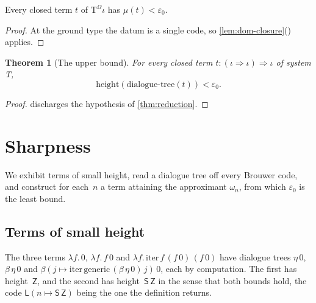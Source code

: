 \documentclass[11pt]{amsart}
\makeatletter
\newcommand{\TmO}{\mathrm{T}^{\Omega}}
\newcommand{\gr}{\iota}                      %
\newcommand{\arr}{\Rightarrow}
\newcommand{\dtree}{\mathrm{dialogue\text{-}tree}}
\newcommand{\height}{\mathrm{height}}
\newcommand{\iterop}{\mathrm{iter}}
\newcommand{\bZ}{\mathsf{Z}}
\newcommand{\bS}{\mathsf{S}}
\newcommand{\bL}{\mathsf{L}}
\newcommand{\eps}{\varepsilon_{0}}
\newcommand{\tower}[1]{\omega_{#1}}           %
\newcommand{\Mj}{\mu}                         %
\newif\ifagdarefs
\newcommand{\AgdaRefs}[1]{\ifagdarefs{\footnotesize\color{agdablue}(#1)}\else\unskip\fi}
\newcommand{\Agda}[2]{{\footnotesize\color{agdablue}\textsf{#1}%
  \ifblank{#2}{}{\texttt{.}\allowbreak\texttt{#2}}}}
\let\ttt@plain\texttt
\renewcommand{\texttt}[1]{{\footnotesize\color{agdablue}\ttt@plain{#1}}}
\theoremstyle{plain}
\newtheorem{theorem}{Theorem}[section]
\theoremstyle{definition}
\makeatother
\begin{document}
\begin{corollary}
\label{cor:mu-below}
Every closed term $t$ of $\TmO\gr$ has $\Mj(t) < \eps$.
\AgdaRefs{\Agda{DialogueTrees.Fundamental}{μᵀ-<-ε₀}.}
\end{corollary}

\begin{proof}
At the ground type the datum is a single code, so
\cref{lem:dom-closure}() applies.
\end{proof}

\begin{theorem}[The upper bound]
\label{thm:main}
For every closed term $t : (\gr\arr\gr)\arr\gr$ of system T,
\[
  \height(\dtree(t)) < \eps .
\]
\AgdaRefs{\Agda{DialogueTrees.Fundamental}{dialogue-tree-height-<-ε₀};
\Agda{DialogueTrees.Main}{restated}.}
\end{theorem}

\begin{proof}
 discharges the hypothesis of
\cref{thm:reduction}.
\end{proof}

\section{Sharpness}
\label{sec:sharp}

We exhibit terms of small height, read a dialogue tree off every
Brouwer code, and construct for each~$n$ a term attaining the
approximant $\tower n$, from which $\eps$ is the least bound.

\subsection{Terms of small height}
\label{sec:small}

\begin{examples}
\label{ex:small}
The three terms
$\lambda f.\,0$, $\lambda f.\,f\,0$ and
$\lambda f.\,\iterop\,f\,(f\,0)\,(f\,0)$ have dialogue trees
$\eta\,0$, $\beta\,\eta\,0$ and
$\beta(j \mapsto \iterop\,\mathrm{generic}\,(\beta\,\eta\,0)\,j)\,0$,
each by computation. The first has height~$\bZ$, and the second has
height~$\bS\,\bZ$ in the sense that both bounds hold, the code
$\bL(n \mapsto \bS\,\bZ)$ being the one the definition returns.
\AgdaRefs{\Agda{DialogueTrees.Examples}{leaf-term};
\texttt{query-term}, \texttt{iterated-term}, \texttt{leaf-tree},
\texttt{query-tree}, \texttt{iterated-tree}, \texttt{leaf-height},
\texttt{query-height-≤}, \texttt{query-height-≥}.}
\end{examples}
\end{document}
